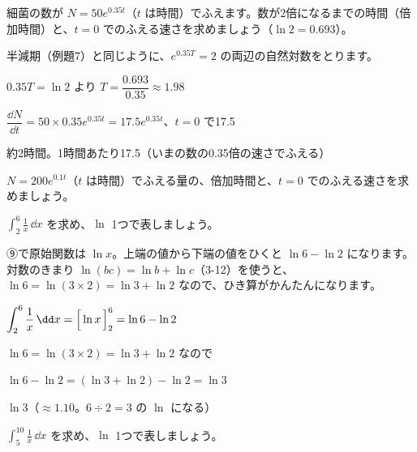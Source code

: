 \begin{reidai}[2倍になるまでの時間]
細菌の数が $N=50e^{0.35t}$（$t$ は時間）でふえます。数が2倍になるまでの時間（倍加時間）と、$t=0$ でのふえる速さを求めましょう（$\ln2=0.693$）。\par
\kangaekata 半減期（例題7）と同じように、$e^{0.35T}=2$ の両辺の自然対数をとります。\par
\shiki $0.35T=\ln2$ より $T=\dfrac{0.693}{0.35}\approx1.98$\par
\hspace*{2.6\zw}$\dfrac{\dd N}{\dd t}=50\times0.35e^{0.35t}=17.5e^{0.35t}$、$t=0$ で17.5\par
\kotae 約2時間。1時間あたり17.5（いまの数の0.35倍の速さでふえる）
\end{reidai}

\begin{jibun}
$N=200e^{0.1t}$（$t$ は時間）でふえる量の、倍加時間と、$t=0$ でのふえる速さを求めましょう。
\end{jibun}

\begin{reidai}
$\displaystyle\int_2^6\frac{1}{x}\,\dd x$ を求め、$\ln$ 1つで表しましょう。\par
\kangaekata ⑨で原始関数は $\ln x$。上端の値から下端の値をひくと $\ln6-\ln2$ になります。対数のきまり $\ln(bc)=\ln b+\ln c$（3-12）を使うと、$\ln6=\ln(3\times2)=\ln3+\ln2$ なので、ひき算がかんたんになります。\par
\shiki $\displaystyle\int_2^6\frac{1}{x}\,\dd x=\Bigl[\,\ln x\,\Bigr]_2^6=\ln6-\ln2$\par
\hspace*{2.6\zw}$\ln6=\ln(3\times2)=\ln3+\ln2$ なので\par
\hspace*{2.6\zw}$\ln6-\ln2=(\ln3+\ln2)-\ln2=\ln3$\par
\kotae $\ln3$（$\approx1.10$。$6\div2=3$ の $\ln$ になる）
\end{reidai}

\begin{jibun}
$\displaystyle\int_5^{10}\frac{1}{x}\,\dd x$ を求め、$\ln$ 1つで表しましょう。
\end{jibun}

